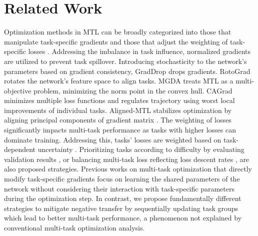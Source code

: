 \section{Related Work}
Optimization methods in MTL can be broadly categorized into those that manipulate task-specific gradients \citep{RN24, RN21, RN22, RN19, RN36, RN20, RN18, liu2021towards, phan2022improving, navon2022multi, senushkin2023independent, jeong2024quantifying} and those that adjust the weighting of task-specific losses \citep{RN23, RN25, RN26, liu2024famo}. Addressing the imbalance in task influence, normalized gradients are utilized \citep{RN24} to prevent task spillover. Introducing stochasticity to the network's parameters based on gradient consistency, GradDrop \citep{RN21} drops gradients. RotoGrad \citep{RN22} rotates the network's feature space to align tasks. MGDA \citep{RN36} treats MTL as a multi-objective problem, minimizing the norm point in the convex hull. CAGrad \citep{RN18} minimizes multiple loss functions and regulates trajectory using worst local improvements of individual tasks. Aligned-MTL \citep{senushkin2023independent} stabilizes optimization by aligning principal components of gradient matrix . The weighting of losses significantly impacts multi-task performance as tasks with higher losses can dominate training. Addressing this, tasks' losses are weighted based on task-dependent uncertainty \citep{RN23}. Prioritizing tasks according to difficulty by evaluating validation results \citep{RN25}, or balancing multi-task loss reflecting loss descent rates \citep{RN26}, are also proposed strategies. Previous works on multi-task optimization that directly modify task-specific gradients \cite{RN24, RN21, RN22, RN19, RN36, RN20, RN18, liu2021towards, phan2022improving, navon2022multi, senushkin2023independent, jeong2024quantifying} focus on learning the shared parameters of the network without considering their interaction with task-specific parameters during the optimization step. In contrast, we propose fundamentally different strategies to mitigate negative transfer by sequentially updating task groups which lead to better multi-task performance, a phenomenon not explained by conventional multi-task optimization analysis.